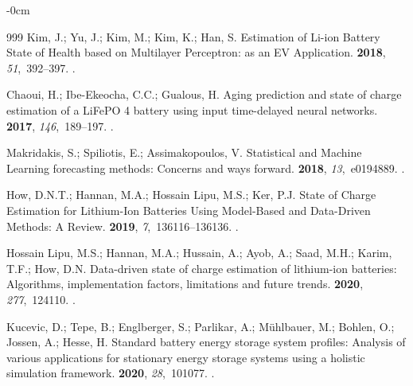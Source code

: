 \documentclass[energies,article,accept,pdftex,moreauthors]{Definitions/mdpi}
\begin{document}
\begin{adjustwidth}{-\extralength}{0cm}
\begin{thebibliography}{999}
Kim, J.; Yu, J.; Kim, M.; Kim, K.; Han, S.
\newblock Estimation of Li-ion Battery State of Health based on Multilayer
  Perceptron: as an EV Application.
 {\bf 2018}, {\em 51},~392--397.
.

Chaoui, H.; Ibe-Ekeocha, C.C.; Gualous, H.
\newblock Aging prediction and state of charge estimation of a LiFePO 4 battery
  using input time-delayed neural networks.
 {\bf 2017}, {\em
  146},~189--197.
.

Makridakis, S.; Spiliotis, E.; Assimakopoulos, V.
\newblock Statistical and Machine Learning forecasting methods: Concerns and
  ways forward.
 {\bf 2018}, {\em 13},~e0194889.
.

How, D.N.T.; Hannan, M.A.; {Hossain Lipu}, M.S.; Ker, P.J.
\newblock State of Charge Estimation for Lithium-Ion Batteries Using
  Model-Based and Data-Driven Methods: A Review.
 {\bf 2019}, {\em 7},~136116--136136.
.

{Hossain Lipu}, M.S.; Hannan, M.A.; Hussain, A.; Ayob, A.; Saad, M.H.; Karim,
  T.F.; How, D.N.
\newblock Data-driven state of charge estimation of lithium-ion batteries:
  Algorithms, implementation factors, limitations and future trends.
 {\bf 2020}, {\em 277},~124110.
.

Kucevic, D.; Tepe, B.; Englberger, S.; Parlikar, A.; M{\"u}hlbauer, M.; Bohlen,
  O.; Jossen, A.; Hesse, H.
\newblock Standard battery energy storage system profiles: Analysis of various
  applications for stationary energy storage systems using a holistic
  simulation framework.
 {\bf 2020}, {\em 28},~101077.
.


\end{thebibliography}
\end{adjustwidth}
\end{document}
